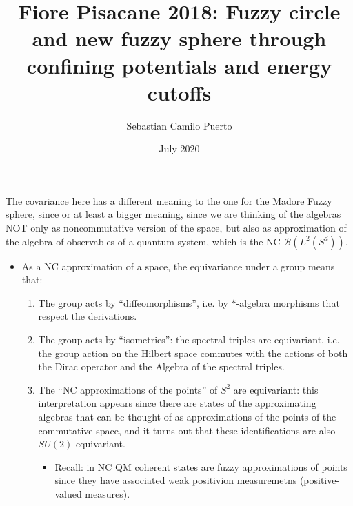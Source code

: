 \documentclass{article}
\title{Fiore Pisacane 2018: Fuzzy circle and new fuzzy sphere through confining potentials and energy cutoffs}
\author{Sebastian Camilo Puerto}
\date{July 2020}
\begin{document}
\maketitle

\tableofcontents

The covariance here has a different meaning to the one for the Madore Fuzzy sphere, since or at least a bigger meaning, since we are thinking of the algebras NOT only as noncommutative version of the space, but also as approximation of the algebra of observables of a quantum system, which is the NC $\mathcal B(L^2(S^d))$.
    \begin{itemize}
        
    \item As a NC approximation of a space, the equivariance under a group means that: 
    
        \begin{enumerate}
        
        \item The group acts by ``diffeomorphisms'', i.e. by $*$-algebra morphisms %
        that respect the derivations.
        
        \item The group acts by ``isometries'': the spectral triples are equivariant, i.e. the group action on the Hilbert space commutes with the actions of both the Dirac operator and the Algebra of the spectral triples.
        
        \item The ``NC approximations of the points'' of $S^2$ are equivariant: this interpretation appears since there are states of the approximating algebras that can be thought of as approximations of the points of the commutative space, and it turns out that these identifications are also $SU(2)$-equivariant.
        
            \begin{itemize}
                
            \item Recall: in NC QM coherent states are fuzzy approximations of points since they have associated weak positivion measuremetns (positive-valued measures).
                
            \end{itemize}
        
        \end{enumerate}
    

\end{itemize}
\end{document}
